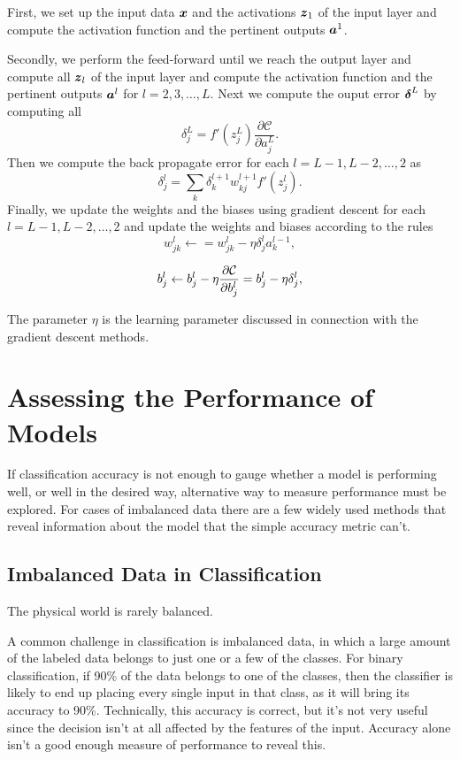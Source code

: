 First, we set up the input data ${\boldsymbol{x}}$ and the activations
${\boldsymbol{z}}_1$ of the input layer and compute the activation function and
the pertinent outputs ${\boldsymbol{a}}^1$.

Secondly, we perform the feed-forward until we reach the output
layer and compute all ${\boldsymbol{z}}_l$ of the input layer and compute the
activation function and the pertinent outputs ${\boldsymbol{a}}^l$ for
$l=2,3,\dots,L$.
Next we compute the ouput error ${\boldsymbol{\delta}}^L$ by computing all
$$\delta_j^L = f'(z_j^L)\frac{\partial\mathcal{C}}{\partial a_j^L}.$$
Then we compute the back propagate error for each $l=L-1,L-2,\dots,2$ as
$$\delta_j^l = \sum_k \delta_k^{l+1}w_{kj}^{l+1}f'(z_j^l).$$
Finally, we update the weights and the biases using gradient descent for 
each $l=L-1,L-2,\dots,2$ and update the weights and biases according to the rules
$$w_{jk}^l\leftarrow  = w_{jk}^l- \eta \delta_j^la_k^{l-1},$$

$$b_j^l \leftarrow b_j^l-\eta \frac{\partial {\cal C}}{\partial b_j^l}=b_j^l-\eta \delta_j^l,$$

\noindent The parameter $\eta$ is the learning parameter discussed in connection with the 
gradient descent methods.

\section{Assessing the Performance of Models}
If classification accuracy is not enough to gauge whether a model is
performing well, or well in the desired way, alternative way to measure
performance must be explored. For cases of imbalanced data there are a few
widely used methods that reveal information about the model that the simple
accuracy metric can't.

\subsection{Imbalanced Data in Classification}
The physical world is rarely balanced.

A common challenge in classification is imbalanced data, in which a large
amount of the labeled data belongs to just one or a few of the classes.
For binary classification, if 90\% of the data belongs to one of the classes,
then the classifier is likely to end up placing every single
input in that class, as it will bring its accuracy to 90\%. Technically, this
accuracy is correct, but it's not very useful since the decision isn't at all
affected by the features of the input. Accuracy alone isn't a good enough
measure of performance to reveal this.

